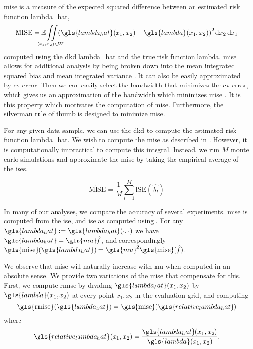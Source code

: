 \subsection{\texorpdfstring{}{}}
\label{subsec:method:mise}

\Gls{mise} is a measure of the expected squared difference between an estimated risk function \gls{lambda_hat},
\begin{equation}
    \mbox{MISE} = \E \iintW{\left(\gls{lambda_hat}\xvec - \gls{lambda}\xvec\right)^2}
\end{equation}
computed using the \gls{dkd} \gls{lambda_hat} and the true risk function \gls{lambda}.
\Gls{mise} allows for additional analysis by being broken down into the mean integrated squared bias and mean integrated variance \citep[p. 36]{silverman1986density}.
It can also be easily approximated by \gls{cv} error.
Then we can easily select the bandwidth that minimizes the \gls{cv} error,
which gives us an approximation of the bandwidth which minimizes \gls{mise} \citep[p. 63]{wand1994kernel}.
It is this property which motivates the computation of \gls{mise}.
Furthermore,
the \gls{silverman} rule of thumb is designed to minimize \gls{mise}.

For any given data sample,
we can use the \gls{dkd} to compute the estimated risk function \gls{lambda_hat}.
We wish to compute the \gls{mise} as described in .
However, it is computationally impractical to compute this integral.
Instead,
we run $M$ monte carlo simulations and approximate the \gls{mise} by taking the empirical average of the \glspl{ise}.

\begin{equation}
    \label{eq:mise_tilde}
    \widetilde{\mbox{MISE}} = \frac{1}{M} \sum_{i=1}^{M} \mbox{ISE}(\hat{\lambda_I})
\end{equation}

In many of our analyses, we compare the accuracy of several experiments.
\gls{mise} is computed from the \gls{ise},
and \gls{ise} as computed using .
For any $\gls{lambda_hat} := \gls{lambda_hat}\dotdot$ we have $\gls{lambda_hat} = \gls{mu} \hat f $,
and correspondingly $ \mbox{\gls{mise}}(\gls{lambda_hat}) = \gls{mu}^2 \mbox{\gls{mise}}(\hat f) $.

We observe that \gls{mise} will naturally increase with \gls{mu} when computed in an absolute sense.
We provide two variations of the \gls{mise} that compensate for this.
First, we compute \gls{rmise} by dividing $\gls{lambda_hat}\xvec$ by $\gls{lambda}\xvec$ at every point $x_1, x_2$ in the evaluation grid, and computing
\begin{equation}
\label{eq:rmise}
    \mbox{\gls{rmise}}(\gls{lambda_hat}) = 
        \mbox{\gls{mise}}(\gls{relative_lambda_hat})
\end{equation}
where
\begin{equation}
\label{eq:relative_lambda_hat}
    \gls{relative_lambda_hat}\xvec = 
        \frac{\gls{lambda_hat}\xvec}{\gls{lambda}\xvec}
        \text{.}
\end{equation}

